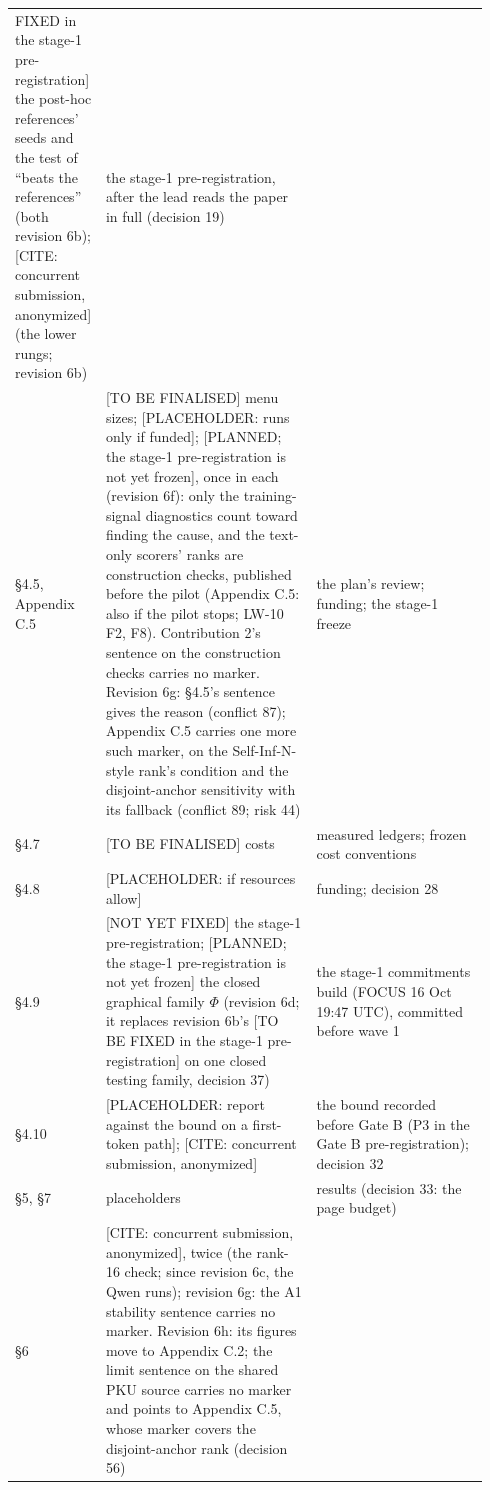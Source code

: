 \documentclass{article}
\theoremstyle{plain}
\theoremstyle{definition}
\theoremstyle{remark}
\begin{document}
\begin{longtable}{@{}L{0.14\linewidth}L{0.44\linewidth}L{0.36\linewidth}@{}}
      FIXED in the stage-1 pre-registration] the post-hoc references' seeds and
      the test of ``beats the references'' (both revision 6b); [CITE: concurrent
      submission, anonymized] (the lower rungs; revision 6b) & the stage-1
      pre-registration, after the lead reads the paper in full (decision 19) \\
  \S{}4.5, Appendix C.5 & [TO BE FINALISED] menu sizes; [PLACEHOLDER: runs only
      if funded]; [PLANNED; the stage-1 pre-registration is not yet frozen],
      once in each (revision 6f): only the training-signal diagnostics count
      toward finding the cause, and the text-only scorers' ranks are
      construction checks, published before the pilot (Appendix C.5: also if the
      pilot stops; LW-10 F2, F8). Contribution 2's sentence on the construction
      checks carries no marker. Revision 6g: \S{}4.5's sentence gives the reason
      (conflict 87); Appendix C.5 carries one more such marker, on the
      Self-Inf-N-style rank's condition and the disjoint-anchor sensitivity with
      its fallback (conflict 89; risk 44) & the plan's review; funding; the
      stage-1 freeze \\
  \S{}4.7 & [TO BE FINALISED] costs & measured ledgers; frozen cost conventions
      \\
  \S{}4.8 & [PLACEHOLDER: if resources allow] & funding; decision 28 \\
  \S{}4.9 & [NOT YET FIXED] the stage-1 pre-registration; [PLANNED; the stage-1
      pre-registration is not yet frozen] the closed graphical family $\Phi$
      (revision 6d; it replaces revision 6b's [TO BE FIXED in the stage-1
      pre-registration] on one closed testing family, decision 37) & the stage-1
      commitments build (FOCUS 16 Oct 19:47 UTC), committed before wave 1 \\
  \S{}4.10 & [PLACEHOLDER: report against the bound on a first-token path];
      [CITE: concurrent submission, anonymized] & the bound recorded before Gate
      B (P3 in the Gate B pre-registration); decision 32 \\
  \S{}5, \S{}7 & placeholders & results (decision 33: the page budget) \\
  \S{}6 & [CITE: concurrent submission, anonymized], twice (the rank-16 check;
      since revision 6c, the Qwen runs); revision 6g: the A1 stability sentence
      carries no marker. Revision 6h: its figures move to Appendix C.2; the
      limit sentence on the shared PKU source carries no marker and points to
      Appendix C.5, whose marker covers the disjoint-anchor rank (decision 56) &

\end{longtable}
\end{document}
